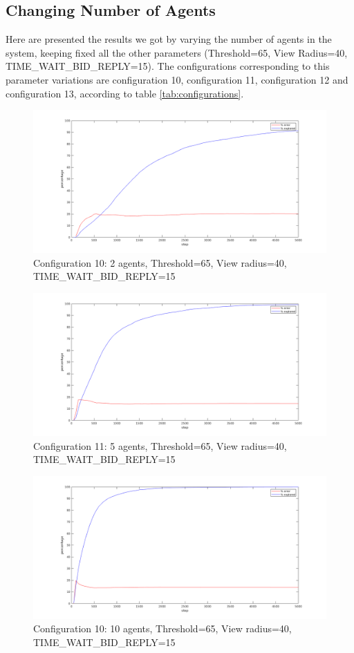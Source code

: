 \documentclass[a4paper, 10pt, conference]{ieeeconf}      %
\begin{document}
\subsection{Changing Number of Agents}
Here are presented the results we got by varying the number of agents in the system, keeping fixed all the other parameters (Threshold=65, View Radius=40, TIME\_WAIT\_BID\_REPLY=15). The configurations corresponding to this parameter variations are configuration 10, configuration 11, configuration 12 and configuration 13, according to table \ref{tab:configurations}. 
\begin{figure}[H]
	\centering
	\includegraphics[width=1\linewidth]{img/config10.png}
	\caption{Configuration 10: 2 agents, Threshold=65, View radius=40, TIME\_WAIT\_BID\_REPLY=15}
	\label{fig:config10}
\end{figure}
\begin{figure}[H]
	\centering
	\includegraphics[width=1\linewidth]{img/config11.png}
	\caption{Configuration 11: 5 agents, Threshold=65, View radius=40, TIME\_WAIT\_BID\_REPLY=15}
	\label{fig:config11}
\end{figure}
\begin{figure}[H]
	\centering
	\includegraphics[width=1\linewidth]{img/config12.png}
	\caption{Configuration 10: 10 agents, Threshold=65, View radius=40, TIME\_WAIT\_BID\_REPLY=15}
	\label{fig:config12}
\end{figure}
\end{document}
